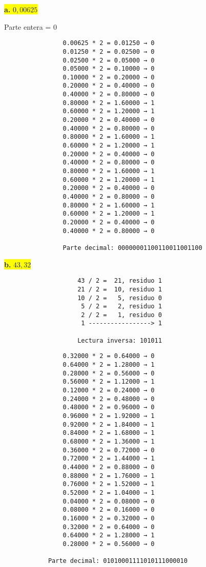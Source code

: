 \documentclass[a4paper,12pt]{article}
\begin{document}
	\begin{center}	
		\colorbox{yellow}{{\textbf{a.} $0,00625$}} \\ \vspace{0.3cm}
		
		Parte entera = 0
		
        	\begin{Verbatim}
        		0.00625 * 2 = 0.01250 → 0 
        		0.01250 * 2 = 0.02500 → 0 
        		0.02500 * 2 = 0.05000 → 0 
        		0.05000 * 2 = 0.10000 → 0 
        		0.10000 * 2 = 0.20000 → 0 
        		0.20000 * 2 = 0.40000 → 0 
        		0.40000 * 2 = 0.80000 → 0 
        		0.80000 * 2 = 1.60000 → 1 
        		0.60000 * 2 = 1.20000 → 1 
        		0.20000 * 2 = 0.40000 → 0 
        		0.40000 * 2 = 0.80000 → 0 
        		0.80000 * 2 = 1.60000 → 1 
        		0.60000 * 2 = 1.20000 → 1 
        		0.20000 * 2 = 0.40000 → 0 
        		0.40000 * 2 = 0.80000 → 0 
        		0.80000 * 2 = 1.60000 → 1 
        		0.60000 * 2 = 1.20000 → 1 
        		0.20000 * 2 = 0.40000 → 0 
        		0.40000 * 2 = 0.80000 → 0 
        		0.80000 * 2 = 1.60000 → 1 
        		0.60000 * 2 = 1.20000 → 1 
        		0.20000 * 2 = 0.40000 → 0 
        		0.40000 * 2 = 0.80000 → 0
        		
        		Parte decimal: 00000001100110011001100
        	\end{Verbatim}
	\end{center}
	\begin{center}
	\colorbox{yellow}{{\textbf{b.} $43,32$}} \\ \vspace{0.3cm}
	             \begin{Verbatim}
	             	43 / 2 =  21, residuo 1
	             	21 / 2 =  10, residuo 1
	             	10 / 2 =   5, residuo 0
	             	 5 / 2 =   2, residuo 1
	             	 2 / 2 =   1, residuo 0
	             	 1 -----------------> 1
	             	
	             	Lectura inversa: 101011
	             \end{Verbatim}
	
	    		\begin{Verbatim}
	    		0.32000 * 2 = 0.64000 → 0 
	    		0.64000 * 2 = 1.28000 → 1 
	    		0.28000 * 2 = 0.56000 → 0 
	    		0.56000 * 2 = 1.12000 → 1 
	    		0.12000 * 2 = 0.24000 → 0 
	    		0.24000 * 2 = 0.48000 → 0 
	    		0.48000 * 2 = 0.96000 → 0 
	    		0.96000 * 2 = 1.92000 → 1 
	    		0.92000 * 2 = 1.84000 → 1 
	    		0.84000 * 2 = 1.68000 → 1 
	    		0.68000 * 2 = 1.36000 → 1 
	    		0.36000 * 2 = 0.72000 → 0 
	    		0.72000 * 2 = 1.44000 → 1 
	    		0.44000 * 2 = 0.88000 → 0 
	    		0.88000 * 2 = 1.76000 → 1 
	    		0.76000 * 2 = 1.52000 → 1 
	    		0.52000 * 2 = 1.04000 → 1 
	    		0.04000 * 2 = 0.08000 → 0 
	    		0.08000 * 2 = 0.16000 → 0 
	    		0.16000 * 2 = 0.32000 → 0 
	    		0.32000 * 2 = 0.64000 → 0 
	    		0.64000 * 2 = 1.28000 → 1 
	    		0.28000 * 2 = 0.56000 → 0
	    
	    	Parte decimal: 01010001111010111000010
	    \end{Verbatim}
	
	\end{center}
\end{document}

